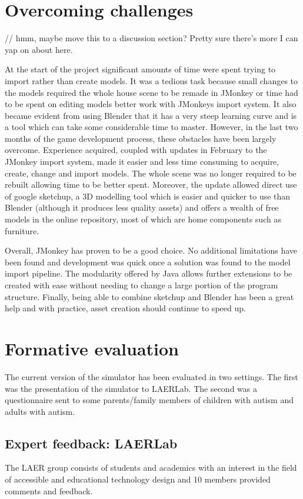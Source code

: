 \documentclass[11pt]{report}
\begin{document}
\section{Overcoming challenges}

// hmm, maybe move this to a discussion section? Pretty sure there's more I can yap on about here. 

At the start of the project significant amounts of time were spent trying to import rather than create models. It was a tedious task because small changes to the models required the whole house scene to be remade in JMonkey or
time had to be spent on editing models better work with JMonkeys import system. It also became evident from using Blender that it has a very steep learning curve and is a tool which can take some considerable time to master.
However, in the last two months of the game development process, these obstacles have been largely overcome. Experience acquired, coupled with updates in February to the JMonkey import system, made it easier and less
time consuming to acquire, create, change and import models. The whole scene was no longer required to be rebuilt allowing time to be better spent. Moreover, the update allowed direct use of google sketchup, a 3D modelling
tool which is easier and quicker to use than Blender (although it produces less quality assets) and offers a wealth of free models in the online repository, most of which are home components such as furniture.

Overall, JMonkey has proven to be a good choice. No additional limitations have been found and development was quick once a solution was found to the model import pipeline. The modularity offered by Java allows
further extensions to be created with ease without needing to change a large portion of the program structure. Finally, being able to combine sketchup and Blender has been a great help and with practice, asset creation should
continue to speed up.

\section{Formative evaluation}
The current version of the simulator has been evaluated in two settings. The first was the presentation of the simulator to LAERLab. The second was a questionnaire sent to some parents/family members of children with autism and adults with autism.

\subsection{Expert feedback: LAERLab}
The LAER group consists of students and academics with an interest in the field of accessible and educational technology design and 10 members provided comments and feedback.
\end{document}
